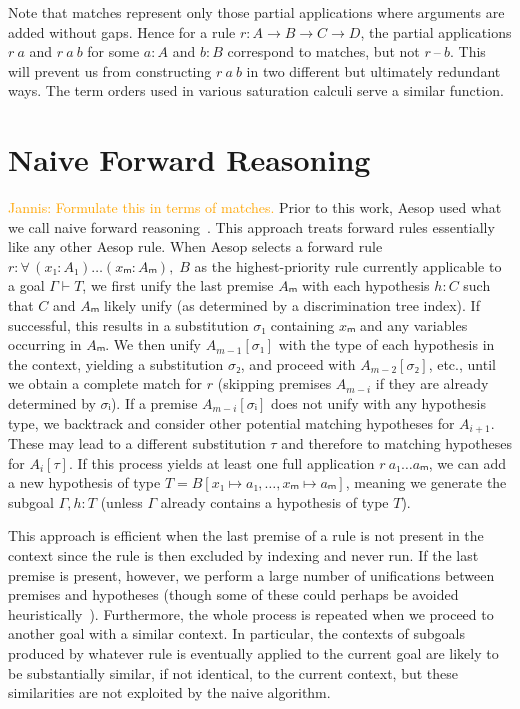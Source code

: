 \documentclass[runningheads]{llncs}
\newcommand{\jcom}[1]{{\textcolor{orange}{Jannis: #1}} }
\newcommand{\All}[2]{\ensuremath{\forall\, #1,\; #2}}
\begin{document}
Note that matches represent only those partial applications where arguments are added without gaps.
Hence for a rule $r : A → B → C → D$, the partial applications $r~a$ and $r~a~b$ for some $a : A$ and $b : B$ correspond to matches, but not $r~\text{--}~b$.
This will prevent us from constructing $r~a~b$ in two different but ultimately redundant ways.
The term orders used in various saturation calculi serve a similar function.

\section{Naive Forward Reasoning}
\label{sec:naive}

\jcom{Formulate this in terms of matches.}
Prior to this work, Aesop used what we call naive forward reasoning~\cite{Aesop}.
This approach treats forward rules essentially like any other Aesop rule.
When Aesop selects a forward rule $r : \All{(x₁ : A₁) \dots (xₘ : Aₘ)}{B}$ as the highest-priority rule currently applicable to a goal $Γ ⊢ T$, we first unify the last premise $Aₘ$ with each hypothesis $h : C$ such that $C$ and $Aₘ$ likely unify (as determined by a discrimination tree index).
If successful, this results in a substitution $σ₁$ containing $xₘ$ and any variables occurring in $Aₘ$.
We then unify $A_{m-1}[σ₁]$ with the type of each hypothesis in the context, yielding a substitution $σ₂$, and proceed with $A_{m-2}[σ₂]$, etc., until we obtain a complete match for $r$ (skipping premises $A_{m-i}$ if they are already determined by $σᵢ$).
If a premise $A_{m-i}[σᵢ]$ does not unify with any hypothesis type, we backtrack and consider other potential matching hypotheses for $A_{i+1}$.
These may lead to a different substitution $τ$ and therefore to matching hypotheses for $A_{i}[τ]$.
If this process yields at least one full application $r~a₁ \dots aₘ$, we can add a new hypothesis of type $T = B[x₁ ↦ a₁, \dots, xₘ ↦ aₘ]$, meaning we generate the subgoal $Γ, h : T$ (unless $Γ$ already contains a hypothesis of type $T$).

This approach is efficient when the last premise of a rule is not present in the context since the rule is then excluded by indexing and never run.
If the last premise is present, however, we perform a large number of unifications between premises and hypotheses (though some of these could perhaps be avoided heuristically~\cite{TammetSubsumption}).
Furthermore, the whole process is repeated when we proceed to another goal with a similar context.
In particular, the contexts of subgoals produced by whatever rule is eventually applied to the current goal are likely to be substantially similar, if not identical, to the current context, but these similarities are not exploited by the naive algorithm.
\end{document}
